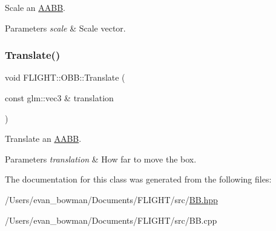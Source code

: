 Scale an \hyperlink{class_f_l_i_g_h_t_1_1_a_a_b_b}{A\+A\+BB}. 


\begin{DoxyParams}{Parameters}
{\em scale} & Scale vector. \\
\hline
\end{DoxyParams}
\mbox{\label{class_f_l_i_g_h_t_1_1_o_b_b_a5e9c1eba7ba4f883e9155665c3723647}} 
\subsubsection{\texorpdfstring{Translate()}{Translate()}}
{\footnotesize\ttfamily void F\+L\+I\+G\+H\+T\+::\+O\+B\+B\+::\+Translate (\begin{DoxyParamCaption}\item[{const glm\+::vec3 \&}]{translation }\end{DoxyParamCaption})}



Translate an \hyperlink{class_f_l_i_g_h_t_1_1_a_a_b_b}{A\+A\+BB}. 


\begin{DoxyParams}{Parameters}
{\em translation} & How far to move the box. \\
\hline
\end{DoxyParams}


The documentation for this class was generated from the following files\+:\begin{DoxyCompactItemize}
\item 
/\+Users/evan\+\_\+bowman/\+Documents/\+F\+L\+I\+G\+H\+T/src/\hyperlink{_b_b_8hpp}{B\+B.\+hpp}\item 
/\+Users/evan\+\_\+bowman/\+Documents/\+F\+L\+I\+G\+H\+T/src/B\+B.\+cpp\end{DoxyCompactItemize}
